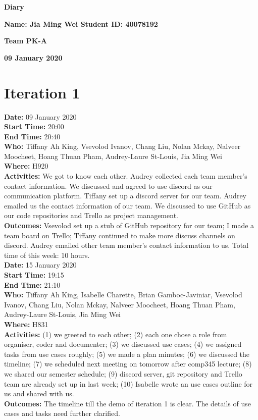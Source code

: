 \documentclass[12pt]{article}
\begin{document}
\vspace*{0.2in}
\centerline{\bf\Large Diary}

\vspace*{0.2in}
\centerline{\bf\Large Name: Jia Ming Wei   Student ID: 40078192}

\vspace*{0.2in}
\centerline{\bf\Large Team PK-A}

\vspace*{0.2in}
\centerline{\bf\Large 09 January 2020}

\section{Iteration 1}

{\bf Date:} 09 January 2020\\
{\bf Start Time:} 20:00\\
{\bf End Time:}  20:40\\
{\bf Who:} Tiffany Ah King,
Vsevolod Ivanov,
Chang Liu,
Nolan Mckay,
Nalveer Moocheet,
Hoang Thuan Pham,
Audrey-Laure St-Louis,
Jia Ming Wei\\
{\bf Where:} H920 \\
{\bf Activities:} We got to know each other. Audrey collected each team member's contact information. We discussed and agreed to use discord as our communication platform. Tiffany set up a discord server for our team. Audrey emailed us the contact information of our team. We discussed to use GitHub as our code repositories and Trello as project management.\\
{\bf Outcomes:}  Vsevolod set up a stub of GitHub repository for our team; I made a team board on Trello; Tiffany continued to make more discuss channels on discord. Audrey emailed other team member's contact information to us. Total time of this week: 10 hours.\\

{\bf Date:} 15 January 2020\\
{\bf Start Time:} 19:15\\
{\bf End Time:}  21:10\\
{\bf Who:} Tiffany Ah King,
Isabelle Charette,
Brian Gamboc-Javiniar,
Vsevolod Ivanov,
Chang Liu,
Nolan Mckay,
Nalveer Moocheet,
Hoang Thuan Pham,
Audrey-Laure St-Louis,
Jia Ming Wei\\
{\bf Where:} H831 \\
{\bf Activities:} (1) we greeted to each other; (2) each one chose a role from organiser, coder and documenter; (3) we discussed use cases; (4) we assigned tasks from use cases roughly; (5) we made a plan minutes; (6) we discussed the timeline; (7) we scheduled next meeting on tomorrow after comp345 lecture; (8) we shared our semester schedule; (9) discord server, git repository and Trello team are already set up in last week; (10) Isabelle wrote an use cases outline for us and shared with us.  \\
{\bf Outcomes:} The timeline till the demo of iteration 1 is clear. The details of use cases and tasks need further clarified. \\
\end{document}
